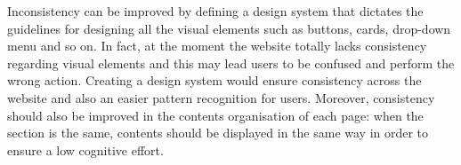 Inconsistency can be improved by defining a design system that dictates the guidelines for designing all the visual elements such as buttons, cards, drop-down menu and so on. In fact, at the moment the website totally lacks consistency regarding visual elements and this may lead users to be confused and perform the wrong action. Creating a design system would ensure consistency across the website and also an easier pattern recognition for users. Moreover, consistency should also be improved in the contents organisation of each page: when the section is the same, contents should be displayed in the same way in order to ensure a low cognitive effort.




